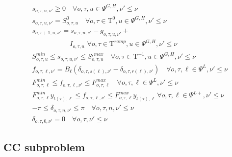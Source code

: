 \documentclass[final]{IEEEtran}
\newcommand{\Tau}{\mathrm{T}}
\begin{document}
\begin{align}
&s_{o, \tau, u, \nu'} \geq 0 \quad \forall o, \tau, u \in \Psi^{G, H}, \nu' \leq \nu \\
&s_{o, \tau, u, \nu'} = S^0_{o, \tau, u} \quad \forall o, \tau \in \Tau^0, u \in \Psi^{G, H}, \nu' \leq \nu \\
&s_{o, \tau + 1, u, \nu'} = s_{o, \tau, u, \nu'} - g_{o, \tau, u, \nu'} + \nonumber \\
&\quad \quad \quad \quad \quad \, \, \, I_{o, \tau, u} \, \, \forall o, \tau \in \Tau^{ramp}, u \in \Psi^{G, H}, \nu' \leq \nu \\
&S^{min}_{o, \tau, u} \leq s_{o, \tau, u, \nu'} \leq S^{, max}_{o, \tau, u} \quad \forall o, \tau \in \Tau^{-1}, u \in \Psi^{G, H}, \nu' \leq \nu \\
&f_{o, \tau, \ell, \nu'} = B_\ell (\delta_{o, \tau, s(\ell), \nu'} - \delta_{o, \tau, r(\ell), \nu'}) \quad \forall o, \tau, \ell \in \Psi^L, \nu' \leq \nu \\
&F_{o, \tau, \ell}^{min} \leq f_{o, \tau, \ell, \nu'} \leq F_{o, \tau, \ell}^{max} \quad \forall o, \tau, \ell \in \Psi^L, \nu' \leq \nu \\
&F_{o, \tau, \ell}^{min} y_{t(\tau), \ell} \leq f_{o, \tau, \ell, \nu'} \leq F_{o, \tau, \ell}^{max} y_{t(\tau), \ell} \, \forall o, \tau, \ell \in \Psi^{L+}, \nu' \leq \nu \\
&-\pi \leq \delta_{o, \tau, n, \nu'} \leq \pi \quad \forall o, \tau, n, \nu' \leq \nu \\
&\label{master_last} \delta_{o, \tau, 0, \nu'} = 0 \quad \forall o, \tau, \nu' \leq \nu
\end{align}

\subsection{CC subproblem}
\end{document}
